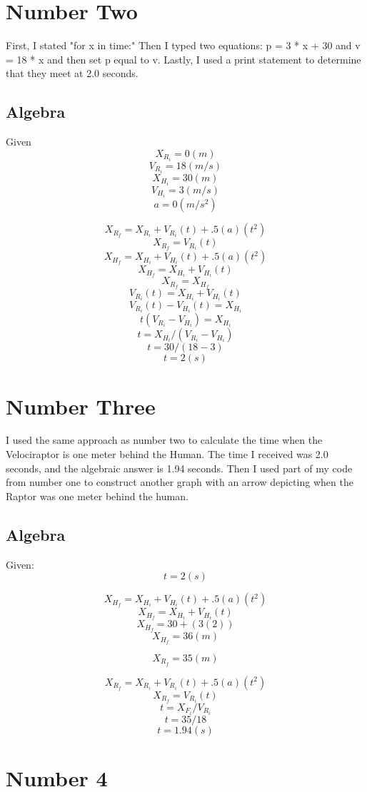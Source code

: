 \documentclass[twocolumn]{revtex4}
\begin{document}
\section{Number Two}
First, I stated "for x in time:" Then I typed two equations: p = 3 * x + 30 and v = 18 * x and then set p equal to v. Lastly, I used a print statement to determine that they meet at 2.0 seconds.
	\subsection{Algebra}
Given 
$$X_R_i = 0 (m)$$		
$$V_R_i = 18 (m/s)$$	
$$X_H_i = 30(m)$$
$$V_H_i = 3 (m/s)$$
$$a = 0 (m/s^2)$$

$$X_R_f = X_R_i + V_R_i(t) + .5(a)(t^2)$$	
$$X_R_f = V_R_i(t)$$						
$$X_H_f = X_H_i + V_H_i(t) + .5(a)(t^2)$$
$$X_H_f = X_H_i + V_H_i(t)$$
$$X_R_f = X_H_f$$ 
$$V_R_i(t) = X_H_i + V_H_i(t)$$
$$V_R_i(t) - V_H_i(t) = X_H_i$$
$$t(V_R_i - V_H_i) = X_H_i$$
$$t = X_H_i / (V_R_i - V_H_i)$$
$$t = 30 / (18 - 3)$$
$$t = 2(s)$$ 

\section{Number Three}
 I used the same approach as number two to calculate the time when the Velociraptor is one meter behind the Human. The time I received was 2.0 seconds, and the algebraic answer is 1.94 seconds. Then I used part of my code from number one to construct another graph with an arrow depicting when the Raptor was one meter behind the human. 
	\subsection{Algebra}
Given:
$$t = 2 (s)$$

$$X_H_f = X_H_i + V_H_i(t) + .5(a)(t^2)$$
$$X_H_f = X_H_i + V_H_i(t)$$
$$X_H_f = 30 + (3(2))$$
$$X_H_f = 36 (m)$$

$$X_R_f = 35 (m)$$ 

$$X_R_f = X_R_i + V_R_i(t) + .5(a)(t^2)$$	
$$X_R_f = V_R_i(t)$$ 
$$t = X_F_i / V_R_i$$
$$t = 35 / 18$$
$$t = 1.94 (s)$$

\section{Number 4}
\end{document}
